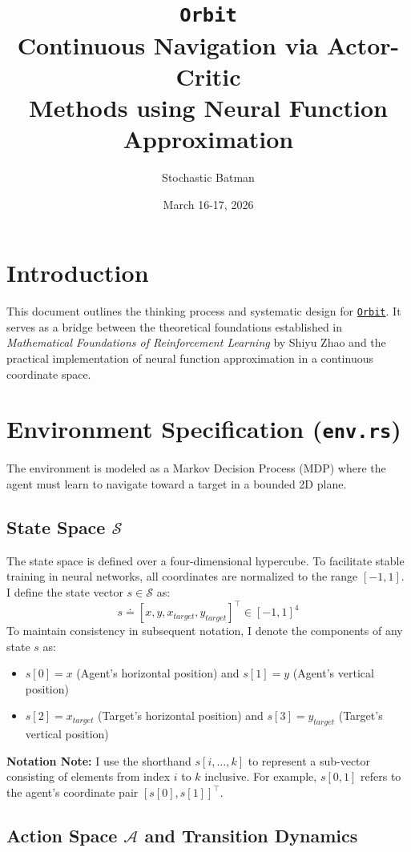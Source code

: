\documentclass[12pt]{article}
\title{\texttt{Orbit} \\ \large Continuous Navigation via Actor-Critic \\ Methods using Neural Function Approximation}
\author{Stochastic Batman}
\date{March 16-17, 2026}
\begin{document}
	
	\maketitle
	
	\section*{Introduction}
	This document outlines the thinking process and systematic design for \href{https://github.com/Stochastic-Batman/Orbit}{\texttt{Orbit}}. It serves as a bridge between the theoretical foundations established in \textit{Mathematical Foundations of Reinforcement Learning} by Shiyu Zhao and the practical implementation of neural function approximation in a continuous coordinate space.
	
	\section{Environment Specification (\texttt{env.rs})}
	
	The environment is modeled as a Markov Decision Process (MDP) where the agent must learn to navigate toward a target in a bounded 2D plane.
	
	\subsection{State Space $\mathcal{S}$}
	
	The state space is defined over a four-dimensional hypercube. To facilitate stable training in neural networks, all coordinates are normalized to the range $[-1, 1]$. I define the state vector $s \in \mathcal{S}$ as:
	$$ s \doteq [x, y, x_{target}, y_{target}]^\top \in [-1, 1]^4 $$ 
	To maintain consistency in subsequent notation, I denote the components of any state $s$ as:
	\begin{itemize}
		\item $s[0] = x$ (Agent's horizontal position) and $s[1] = y$ (Agent's vertical position)
		\item $s[2] = x_{target}$ (Target's horizontal position) and $s[3] = y_{target}$ (Target's vertical position)
	\end{itemize}
	\textbf{Notation Note:} I use the shorthand $s[i, \dots, k]$ to represent a sub-vector consisting of elements from index $i$ to $k$ inclusive. For example, $s[0, 1]$ refers to the agent's coordinate pair $[s[0], s[1]]^\top$.
	
	\subsection{Action Space $\mathcal{A}$ and Transition Dynamics}
	
\end{document}
